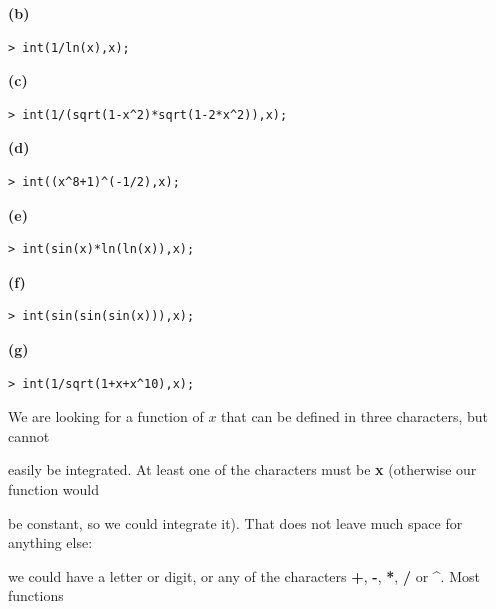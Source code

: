 \documentclass{article}
\begin{document}
\begin{Maple Normal}
\textbf{(b)}
\end{Maple Normal}
\begin{lstlisting}
> int(1/ln(x),x);
\end{lstlisting}
\begin{Maple Normal}
\textbf{(c)}
\end{Maple Normal}
\begin{lstlisting}
> int(1/(sqrt(1-x^2)*sqrt(1-2*x^2)),x);
\end{lstlisting}
\begin{Maple Normal}
\textbf{(d)}
\end{Maple Normal}
\begin{lstlisting}
> int((x^8+1)^(-1/2),x);
\end{lstlisting}
\begin{Maple Normal}
\textbf{(e)}
\end{Maple Normal}
\begin{lstlisting}
> int(sin(x)*ln(ln(x)),x);
\end{lstlisting}
\begin{Maple Normal}
\textbf{(f)}
\end{Maple Normal}
\begin{lstlisting}
> int(sin(sin(sin(x))),x);
\end{lstlisting}
\begin{Maple Normal}
\textbf{(g)}
\end{Maple Normal}
\begin{lstlisting}
> int(1/sqrt(1+x+x^10),x);
\end{lstlisting}
\begin{Maple Normal}

\end{Maple Normal}
\begin{Maple Normal}
We are looking for a function of 
$x$ that can be defined in three characters, but cannot
\end{Maple Normal}
\begin{Maple Normal}
easily be integrated.  At least one of the characters must be \textcolor[RGB]{255,0,0}{\textbf{x}} (otherwise our function would
\end{Maple Normal}
\begin{Maple Normal}
be constant, so we could integrate it).  That does not leave much space for anything else:
\end{Maple Normal}
\begin{Maple Normal}
we could have a letter or digit, or any of the characters \textcolor[RGB]{255,0,0}{\textbf{+}}, \textcolor[RGB]{255,0,0}{\textbf{-}}, \textcolor[RGB]{255,0,0}{\textbf{*}}, \textcolor[RGB]{255,0,0}{\textbf{/}} or \textcolor[RGB]{255,0,0}{\textbf{^}}.  Most functions 
\end{Maple Normal}
\end{document}
